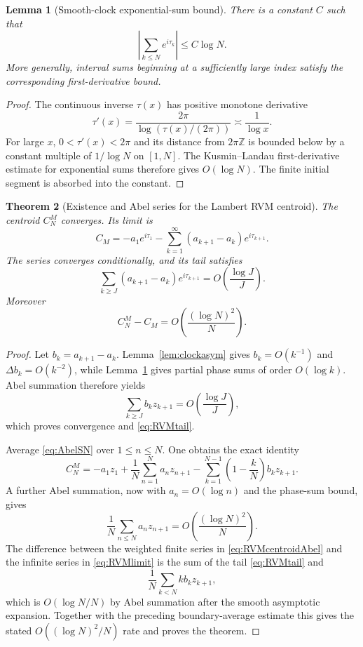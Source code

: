 \documentclass[11pt]{amsart}
\numberwithin{equation}{section}
\newtheorem{theorem}{Theorem}[section]
\newtheorem{lemma}[theorem]{Lemma}
\theoremstyle{definition}
\theoremstyle{remark}
\begin{document}
\begin{lemma}[Smooth-clock exponential-sum bound]\label{lem:KL}
There is a constant $C$ such that
\[
\left|\sum_{k\le N}e^{i\tau_k}\right|\le C\log N.
\]
More generally, interval sums beginning at a sufficiently large index satisfy the corresponding first-derivative bound.
\end{lemma}
\begin{proof}
The continuous inverse $\tau(x)$ has positive monotone derivative
\[
\tau'(x)=\frac{2\pi}{\log(\tau(x)/(2\pi))}\asymp\frac1{\log x}.
\]
For large $x$, $0<\tau'(x)<2\pi$ and its distance from $2\pi\mathbb Z$ is bounded below by a constant multiple of $1/\log N$ on $[1,N]$.  The Kusmin--Landau first-derivative estimate for exponential sums therefore gives $O(\log N)$.  The finite initial segment is absorbed into the constant.
\end{proof}

\begin{theorem}[Existence and Abel series for the Lambert RVM centroid]\label{thm:RVMlimit}
The centroid $C_N^M$ converges.  Its limit is
\begin{equation}\label{eq:RVMlimit}
\boxed{
C_M=-a_1e^{i\tau_1}
-\sum_{k=1}^{\infty}(a_{k+1}-a_k)e^{i\tau_{k+1}}.
}
\end{equation}
The series converges conditionally, and its tail satisfies
\begin{equation}\label{eq:RVMtail}
\sum_{k\ge J}(a_{k+1}-a_k)e^{i\tau_{k+1}}
=O\!\left(\frac{\log J}{J}\right).
\end{equation}
Moreover
\[
C_N^M-C_M=O\!\left(\frac{(\log N)^2}{N}\right).
\]
\end{theorem}
\begin{proof}
Let $b_k=a_{k+1}-a_k$.  Lemma~\ref{lem:clockasym} gives $b_k=O(k^{-1})$ and $\Delta b_k=O(k^{-2})$, while Lemma~\ref{lem:KL} gives partial phase sums of order $O(\log k)$.  Abel summation therefore yields
\[
\sum_{k\ge J}b_kz_{k+1}
=O\!\left(\frac{\log J}{J}\right),
\]
which proves convergence and \eqref{eq:RVMtail}.

Average \eqref{eq:AbelSN} over $1\le n\le N$.  One obtains the exact identity
\begin{equation}\label{eq:RVMcentroidAbel}
C_N^M
=-a_1z_1
+\frac1N\sum_{n=1}^N a_nz_{n+1}
-\sum_{k=1}^{N-1}\left(1-\frac{k}{N}\right)b_kz_{k+1}.
\end{equation}
A further Abel summation, now with $a_n=O(\log n)$ and the phase-sum bound, gives
\[
\frac1N\sum_{n\le N}a_nz_{n+1}=O\!\left(\frac{(\log N)^2}{N}\right).
\]
The difference between the weighted finite series in \eqref{eq:RVMcentroidAbel} and the infinite series in \eqref{eq:RVMlimit} is the sum of the tail \eqref{eq:RVMtail} and
\[
\frac1N\sum_{k<N}k b_kz_{k+1},
\]
which is $O(\log N/N)$ by Abel summation after the smooth asymptotic expansion.  Together with the preceding boundary-average estimate this gives the stated $O((\log N)^2/N)$ rate and proves the theorem.
\end{proof}
\end{document}
